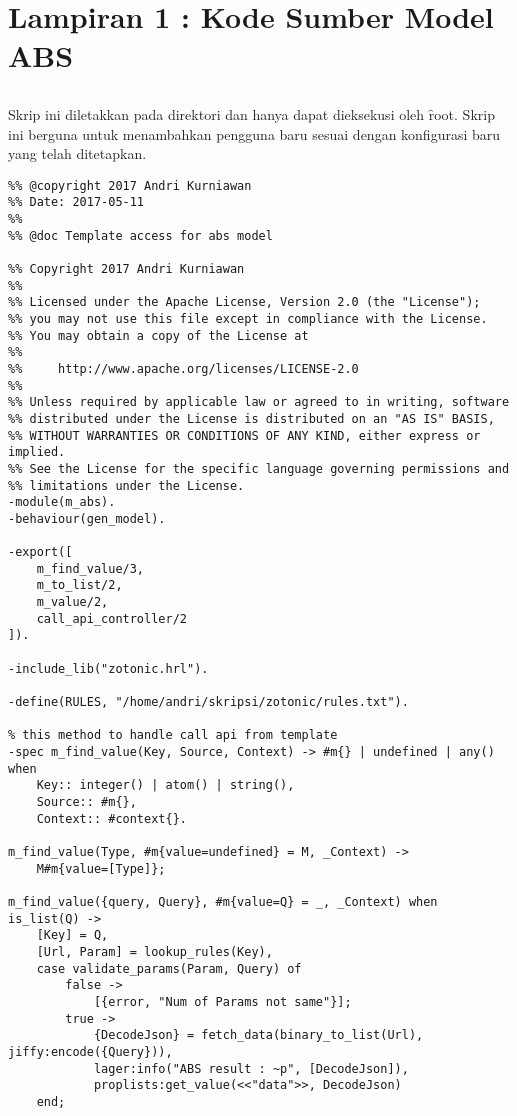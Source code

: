 \chapter*{Lampiran 1 : Kode Sumber Model ABS}
\section*{} \label{cha:lampir-abs}
Skrip ini diletakkan pada direktori  dan hanya dapat dieksekusi oleh \f{root}. Skrip ini berguna untuk menambahkan pengguna baru sesuai dengan konfigurasi baru yang telah ditetapkan.
\begin{lstlisting}[style=L,caption={Skrip adaptor m\_abs.erl},label={lst:mabs}]
%% @author Andri Kurniawan <andrikurniawan.id@gmail.com>
%% @copyright 2017 Andri Kurniawan
%% Date: 2017-05-11
%%
%% @doc Template access for abs model

%% Copyright 2017 Andri Kurniawan
%%
%% Licensed under the Apache License, Version 2.0 (the "License");
%% you may not use this file except in compliance with the License.
%% You may obtain a copy of the License at
%%
%%     http://www.apache.org/licenses/LICENSE-2.0
%%
%% Unless required by applicable law or agreed to in writing, software
%% distributed under the License is distributed on an "AS IS" BASIS,
%% WITHOUT WARRANTIES OR CONDITIONS OF ANY KIND, either express or implied.
%% See the License for the specific language governing permissions and
%% limitations under the License.
-module(m_abs).
-behaviour(gen_model).

-export([
	m_find_value/3,
	m_to_list/2,
	m_value/2,
	call_api_controller/2
]).

-include_lib("zotonic.hrl").

-define(RULES, "/home/andri/skripsi/zotonic/rules.txt").

% this method to handle call api from template
-spec m_find_value(Key, Source, Context) -> #m{} | undefined | any() when
    Key:: integer() | atom() | string(),
    Source:: #m{},
    Context:: #context{}.

m_find_value(Type, #m{value=undefined} = M, _Context) ->
    M#m{value=[Type]};

m_find_value({query, Query}, #m{value=Q} = _, _Context) when is_list(Q) ->
	[Key] = Q,
	[Url, Param] = lookup_rules(Key),
	case validate_params(Param, Query) of
		false ->
			[{error, "Num of Params not same"}];
		true ->
			{DecodeJson} = fetch_data(binary_to_list(Url), jiffy:encode({Query})),
			lager:info("ABS result : ~p", [DecodeJson]),
			proplists:get_value(<<"data">>, DecodeJson)
	end;


\end{lstlisting}
